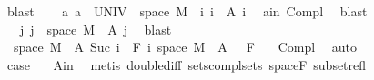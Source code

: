 \begin{isabellebody}
\ blast\isanewline
\ \ \isamarkupfalse%
\ a{\isacharcolon}{\kern0pt}\ {\isachardoublequoteopen}a\ {\isacharequal}{\kern0pt}\ UNIV\ {\isasymtimes}\ space\ M\ {\isacharminus}{\kern0pt}\ {\isacharparenleft}{\kern0pt}{\isasymUnion}i{\isachardot}{\kern0pt}\ {\isacharbraceleft}{\kern0pt}i{\isacharbraceright}{\kern0pt}\ {\isasymtimes}\ A\ i{\isacharparenright}{\kern0pt}{\isachardoublequoteclose}\ \isamarkupfalse%
\ a{\isacharunderscore}{\kern0pt}in\ Compl{\isacharparenleft}{\kern0pt}{}{\isacharparenright}{\kern0pt}\ \isamarkupfalse%
\ blast\isanewline
\ \ \isamarkupfalse%
\ \isamarkupfalse%
\ {\isachardoublequoteopen}{\isachardot}{\kern0pt}{\isachardot}{\kern0pt}{\isachardot}{\kern0pt}\ {\isacharequal}{\kern0pt}\ {\isacharparenleft}{\kern0pt}{\isasymUnion}j{\isachardot}{\kern0pt}\ {\isacharbraceleft}{\kern0pt}j{\isacharbraceright}{\kern0pt}\ {\isasymtimes}\ {\isacharparenleft}{\kern0pt}space\ M\ {\isacharminus}{\kern0pt}\ A\ j{\isacharparenright}{\kern0pt}{\isacharparenright}{\kern0pt}{\isachardoublequoteclose}\ \isamarkupfalse%
\ blast\isanewline
\ \ \isamarkupfalse%
\ \isamarkupfalse%
\ {\isacharasterisk}{\kern0pt}{\isacharcolon}{\kern0pt}\ {\isachardoublequoteopen}{\isacharparenleft}{\kern0pt}space\ M\ {\isacharminus}{\kern0pt}\ A\ {\isacharparenleft}{\kern0pt}Suc\ i{\isacharparenright}{\kern0pt}{\isacharparenright}{\kern0pt}\ {\isasymin}\ F\ i{\isachardoublequoteclose}\ {\isachardoublequoteopen}{\isacharparenleft}{\kern0pt}space\ M\ {\isacharminus}{\kern0pt}\ A\ {}{\isacharparenright}{\kern0pt}\ {\isasymin}\ F\ {}{\isachardoublequoteclose}\ \isamarkupfalse%
\ Compl{\isacharparenleft}{\kern0pt}{}{\isacharcomma}{\kern0pt}{}{\isacharparenright}{\kern0pt}\ \isamarkupfalse%
\ auto\isanewline
\ \ \isacommand{{\isacharbraceleft}{\kern0pt}}\isamarkupfalse%
\isanewline
\ \ \ \ \isamarkupfalse%
\ {}\isanewline
\ \ \ \ \isamarkupfalse%
\ \isamarkupfalse%
\ {\isacharquery}{\kern0pt}case\ \isamarkupfalse%
\ {\isacharasterisk}{\kern0pt}\ A{\isacharunderscore}{\kern0pt}in\ \isamarkupfalse%
\ {\isacharparenleft}{\kern0pt}metis\ double{\isacharunderscore}{\kern0pt}diff\ sets{\isachardot}{\kern0pt}compl{\isacharunderscore}{\kern0pt}sets\ space{\isacharunderscore}{\kern0pt}F\ subset{\isacharunderscore}{\kern0pt}refl{\isacharparenright}{\kern0pt}\isanewline

\end{isabellebody}
